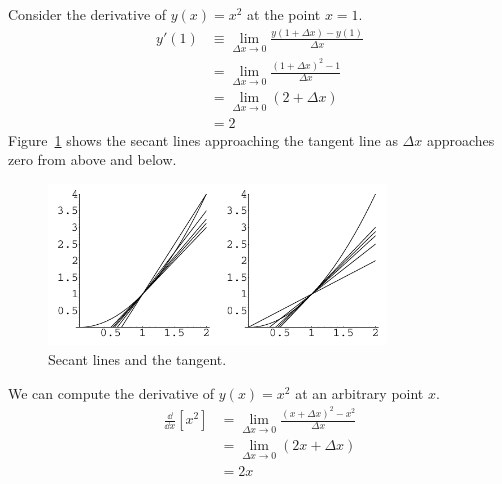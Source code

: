 \begin{Example}
  Consider the derivative of $y(x) = x^2$ at the point $x = 1$.
  \begin{align*}
    y'(1)   &\equiv \lim_{\Delta x \to 0} 
    \frac{y(1 + \Delta x) - y(1) }{ \Delta x } \\
    &= \lim_{\Delta x \to 0} \frac{(1 + \Delta x)^2 - 1}{\Delta x} \\
    &= \lim_{\Delta x \to 0} ( 2 + \Delta x ) \\
    &= 2
  \end{align*}
  Figure~\ref{secantx2} shows the secant lines approaching the tangent line
  as $\Delta x$ approaches zero from above and below.
  \begin{figure}[h!]
    \begin{center}
      \includegraphics[width=0.8\textwidth]{calculus/differential/secantx2}
    \end{center}
    \caption{Secant lines and the tangent.}
    \label{secantx2}
  \end{figure}
\end{Example}





\begin{Example}
  We can compute the derivative of $y(x) = x^2$ at an arbitrary point $x$.
  \begin{align*}
    \frac{\dd}{\dd x} \left[ x^2 \right]
    &= \lim_{\Delta x \to 0} \frac{(x + \Delta x)^2 - x^2 }{\Delta x} \\
    &= \lim_{\Delta x \to 0} (2 x + \Delta x) \\
    &= 2 x
  \end{align*}
\end{Example}







